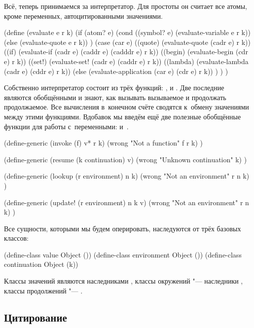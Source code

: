 Всё, теперь принимаемся за интерпретатор. Для простоты он считает все атомы,
кроме переменных, автоцитированными значениями.

\begin{code:lisp}
(define (evaluate e r k)
  (if (atom? e)
      (cond ((symbol? e) (evaluate-variable e r k))
            (else        (evaluate-quote e r k)) ) 
      (case (car e)
        ((quote)  (evaluate-quote (cadr e) r k))
        ((if)     (evaluate-if (cadr e) (caddr e) (cadddr e) r k))
        ((begin)  (evaluate-begin (cdr e) r k))
        ((set!)   (evaluate-set! (cadr e) (caddr e) r k))
        ((lambda) (evaluate-lambda (cadr e) (cddr e) r k))
        (else     (evaluate-application (car e) (cdr e) r k)) ) ) )
\end{code:lisp}

Собственно интерпретатор состоит из трёх функций: ,  и
. Две последние являются обобщёнными и знают, как вызывать вызываемое
и продолжать продолжаемое. Все вычисления в~конечном счёте сводятся к~обмену
значениями между этими функциями. Вдобавок мы введём ещё две полезные обобщённые
функции для работы с~переменными:  и~.

\begin{code:lisp}
(define-generic (invoke (f) v* r k)
  (wrong "Not a function" f r k) )

(define-generic (resume (k continuation) v)
  (wrong "Unknown continuation" k) )

(define-generic (lookup (r environment) n k)
  (wrong "Not an environment" r n k) )

(define-generic (update! (r environment) n k v)
  (wrong "Not an environment" r n k) )
\end{code:lisp}

Все сущности, которыми мы будем оперировать, наследуются от трёх базовых
классов:

\begin{code:lisp}
(define-class value        Object ())
(define-class environment  Object ())
(define-class continuation Object (k))
\end{code:lisp}

Классы значений являются наследниками , классы окружений "---
наследники , классы продолжений "--- .


\subsection{Цитирование}\label{escape/actors/ssect:quoting}

